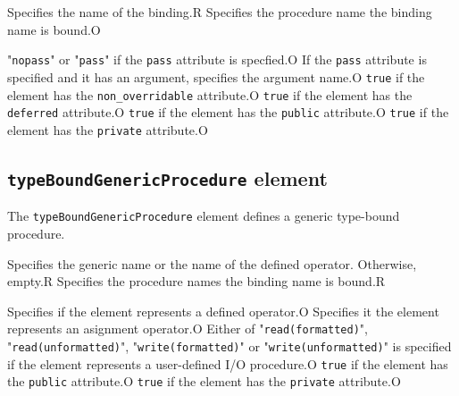 \begin{XcodeMLChildElements}
{Specifies the name of the binding.}{R}
{Specifies the procedure name the binding name is bound.}{O}
\end{XcodeMLChildElements}

\begin{XcodeMLAttributes}
{"{\tt nopass}" or "{\tt pass}" if the {\tt pass} attribute is specfied.}{O}
{If the {\tt pass} attribute is specified and it has an argument, specifies the argument name.}{O}
{{\tt true} if the element has the {\tt non\_overridable} attribute.}{O}
{{\tt true} if the element has the {\tt deferred} attribute.}{O}
{{\tt true} if the element has the {\tt public} attribute.}{O}
{{\tt true} if the element has the {\tt private} attribute.}{O}
\end{XcodeMLAttributes}


\subsection{ {\tt typeBoundGenericProcedure} element}

The {\tt typeBoundGenericProcedure} element defines a generic type-bound procedure.


\begin{XcodeMLChildElements}
{Specifies the generic name or the name of the defined operator. Otherwise, empty.}{R}
{Specifies the procedure names the binding name is bound.}{R}
\end{XcodeMLChildElements}

\begin{XcodeMLAttributes}
{Specifies if the element represents a defined operator.}{O}
{Specifies it the element represents an asignment operator.}{O}
{Either of "{\tt read(formatted)}", "{\tt read(unformatted)}",
 "{\tt write(formatted)}" or "{\tt write(unformatted)}" is specified if the element represents
 a user-defined I/O procedure.}{O}
{{\tt true} if the element has the {\tt public} attribute.}{O}
{{\tt true} if the element has the {\tt private} attribute.}{O}
\end{XcodeMLAttributes}


